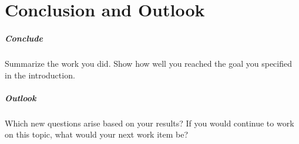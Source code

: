 \documentclass{listhesis}
\begin{document}
\chapter{Conclusion and Outlook}
\paragraph{Conclude}
Summarize the work you did. Show how well you reached the goal you
specified in the introduction.

\paragraph{Outlook}
Which new questions arise based on your results? If you would continue
to work on this topic, what would your next work item be?

\cleardoublepage



\confirmation
\end{document}
